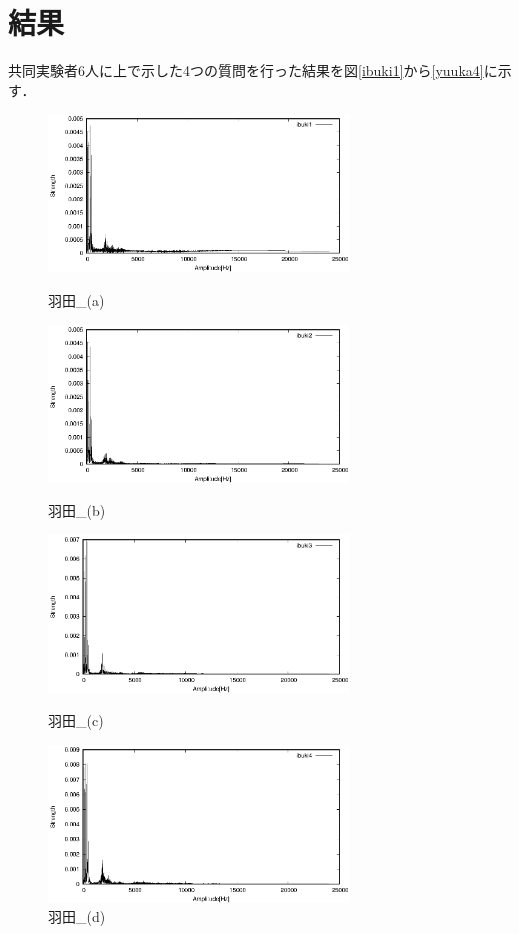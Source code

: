 \documentclass[titlepage]{jarticle}
\begin{document}
\section{結果}
共同実験者6人に上で示した4つの質問を行った結果を図\ref{ibuki1}から\ref{yuuka4}に示す．
\begin{figure}[H]
  \begin{minipage}{0.495\hsize}
    \centering
    \includegraphics[width=8cm]{img/ibuki1.eps}
    \caption{羽田\_(a)}
    \label{ibuki1}
  \end{minipage}
  \begin{minipage}{0.495\hsize}
    \centering
    \includegraphics[width=8cm]{img/ibuki2.eps}
    \caption{羽田\_(b)}
    \label{ibuki2}
  \end{minipage}

  \begin{minipage}{0.495\hsize}
    \centering
    \includegraphics[width=8cm]{img/ibuki3.eps}
    \caption{羽田\_(c)}
    \label{ibuki3}
  \end{minipage}
  \begin{minipage}{0.495\hsize}
    \centering
    \includegraphics[width=8cm]{img/ibuki4.eps}
    \caption{羽田\_(d)}
    \label{ibuki4}
  \end{minipage}
\end{figure}
\end{document}

